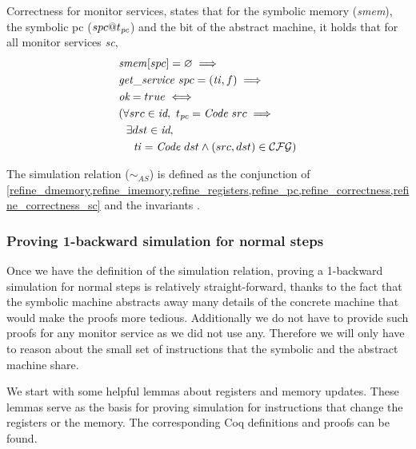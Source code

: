 \begin{definition}
  \label{refine_correctness_sc}
  Correctness for monitor services, states that for the symbolic memory
  (\textit{smem}), the symbolic pc ($spc@t_{\textit{pc}}$) and the \ok bit
  of the abstract machine, it holds that for all monitor services
  \textit{sc},
  \begin{align*}
     & \mathit{smem}[spc] = \varnothing \implies \\
     & \mathit{get\_service}~spc = (\mathit{ti},f) \implies \\
     & \textit{ok} = true  \iff \\
     & (\forall src \in \textit{id}, ~ t_{\textit{pc}} = \textit{Code}~src \implies  \\
     & ~~\exists dst \in \textit{id}, \\
     & ~~~~ \mathit{ti} = \textit{Code}~dst \land (src,dst) \in \mathcal{CFG})
    \end{align*}
\end{definition}

The simulation relation ($\sim_{AS}$) is defined as the conjunction of
\cref{refine_dmemory,refine_imemory,refine_registers,refine_pc,refine_correctness,refine_correctness_sc}
and the invariants
.

\subsubsection{Proving 1-backward simulation for normal steps}
\label{sec:backward_SA_normal}

Once we have the definition of the simulation relation, proving a
1-backward simulation for normal steps is relatively straight-forward,
thanks to the fact that the symbolic machine abstracts away
many details of the concrete machine that would make the proofs more
tedious. Additionally we do not have to provide such proofs for any
monitor service as we did not use any. Therefore we will only have to
reason about the small set of instructions that the symbolic and the
abstract machine share.

We start with some helpful lemmas about registers and memory
updates. These lemmas serve as the basis for proving simulation for
instructions that change the registers or the memory. The
corresponding Coq definitions and proofs can be found.

